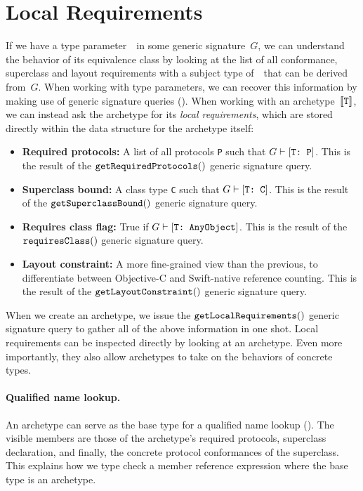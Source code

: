\documentclass[../generics]{subfiles}
\begin{document}
\section{Local Requirements}\label{local requirements}

If we have a type parameter~\tT\ in some generic signature~$G$, we can understand the behavior of its equivalence class by looking at the list of all conformance, superclass and layout requirements with a subject type of~\tT\ that can be derived from~$G$. When working with type parameters, we can recover this information by making use of generic signature queries (). When working with an archetype~$[\![\texttt{T}]\!]$, we can instead ask the archetype for its \emph{local requirements}, which are stored directly within the data structure for the archetype itself:
\begin{itemize}
\item \textbf{Required protocols:} A list of all protocols \texttt{P} such that $G\vdash[\texttt{T:~P}]$. This is the result of the $\texttt{getRequiredProtocols}()$ generic signature query.
\item \textbf{Superclass bound:} A class type \texttt{C} such that $G\vdash[\texttt{T:~C}]$. This is the result of the $\texttt{getSuperclassBound}()$ generic signature query.
\item \textbf{Requires class flag:} True if $G\vdash[\texttt{T:~AnyObject}]$. This is the result of the $\texttt{requiresClass}()$ generic signature query.
\item \textbf{Layout constraint:} A more fine-grained view than the previous, to differentiate between Objective-C and Swift-native reference counting. This is the result of the $\texttt{getLayoutConstraint}()$ generic signature query.
\end{itemize}
When we create an archetype, we issue the $\texttt{getLocalRequirements}()$ generic signature query to gather all of the above information in one shot. Local requirements can be inspected directly by looking at an archetype. Even more importantly, they also allow archetypes to take on the behaviors of concrete types.

\paragraph{Qualified name lookup.} An archetype can serve as the base type for a qualified name lookup (). The visible members are those of the archetype's required protocols, superclass declaration, and finally, the concrete protocol conformances of the superclass. This explains how we type check a member reference expression where the base type is an archetype.
\end{document}
